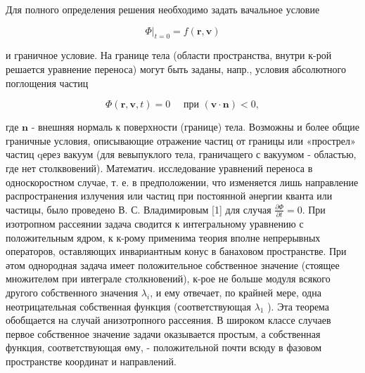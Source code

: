 \documentclass[10pt]{article}
\begin{document}
Для полного определения решения необходимо задать вачальное условие



\[

\left.\Phi\right|_{t=0}=f(\boldsymbol{r}, \boldsymbol{v})

\]



и граничное условие. На границе тела (области пространства, внутри к-рой решается уравнение переноса) могут быть заданы, напр., условия абсолютного поглощения частиц



\[

\Phi(\boldsymbol{r}, \boldsymbol{v}, t)=0 \quad \text { при }(\boldsymbol{v} \cdot \boldsymbol{n})<0,

\]



где $\boldsymbol{n}$ - внешняя нормаль к поверхности (границе) тела. Возможны и более общие граничные условия, описывающие отражение частиц от границы или «прострел» частиц qерез вакуум (для вевыпуклого тела, граничащего с вакуумом - областью, где нет столквовений). Математич. исследование уравнений переноса в односкоростном случае, т. е. в предположении, что изменяется лишь направление распространения излучения или частиц при постоянной әнергии кванта или частицы, было проведено В. С. Владимировым [1] для случая $\frac{\partial \Phi}{\partial t}=0$. При изотропном рассеянии задача сводится к интегральному уравнению с положительным ядром, к к-рому применима теория вполне непрерывных операторов, оставляющих инвариантным конус в банаховом пространстве. При әтом однородная задача имеет положительное собственное значение (стоящее множителөм при ивтеграле столкновений), к-рое не больше модуля всякого другого собственного значения $\lambda_{i}$, и ему отвечает, по крайней мере, одна неотрицательная собственная функция (соответствующая $\lambda_{1}$ ). Эта теорема обобщается на случай анизотропного рассеяния. В широком классе случаев первое собственное значение задачи оказывается простым, а собственная функция, соответствующая өму, - положительной почти всюду в фазовом пространстве координат и направлений.
\end{document}
